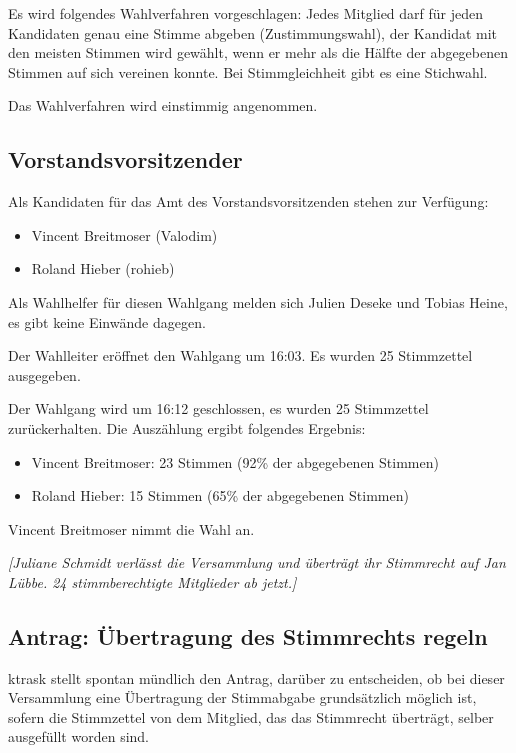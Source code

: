 \documentclass[a4paper,12pt]{scrartcl}
\begin{document}
Es wird folgendes Wahlverfahren vorgeschlagen: Jedes Mitglied darf für jeden
Kandidaten genau eine Stimme abgeben (Zustimmungswahl), der Kandidat mit den
meisten Stimmen wird gewählt, wenn er mehr als die Hälfte der abgegebenen
Stimmen auf sich vereinen konnte. Bei Stimmgleichheit gibt es eine Stichwahl.

Das Wahlverfahren wird einstimmig angenommen.

\subsection{Vorstandsvorsitzender}
Als Kandidaten für das Amt des Vorstandsvorsitzenden stehen zur Verfügung:
\begin{itemize}
  \item Vincent Breitmoser (Valodim)
  \item Roland Hieber (rohieb)
\end{itemize}

Als Wahlhelfer für diesen Wahlgang melden sich Julien Deseke und Tobias Heine,
es gibt keine Einwände dagegen.

Der Wahlleiter eröffnet den Wahlgang um 16:03. Es wurden 25 Stimmzettel
ausgegeben.

Der Wahlgang wird um 16:12 geschlossen, es wurden 25 Stimmzettel zurückerhalten.
Die Auszählung ergibt folgendes Ergebnis:

\begin{itemize}
  \item Vincent Breitmoser: 23 Stimmen (92\% der abgegebenen Stimmen)
  \item Roland Hieber: 15 Stimmen (65\% der abgegebenen Stimmen)
\end{itemize}

Vincent Breitmoser nimmt die Wahl an.

\emph{[Juliane Schmidt verlässt die Versammlung und überträgt ihr Stimmrecht auf
Jan Lübbe. 24 stimmberechtigte Mitglieder ab jetzt.]}

\subsection{Antrag: Übertragung des Stimmrechts regeln}
ktrask stellt spontan mündlich den Antrag, darüber zu entscheiden, ob bei dieser
Versammlung eine Übertragung der Stimmabgabe grundsätzlich möglich ist, sofern
die Stimmzettel von dem Mitglied, das das Stimmrecht überträgt, selber
ausgefüllt worden sind.
\end{document}
